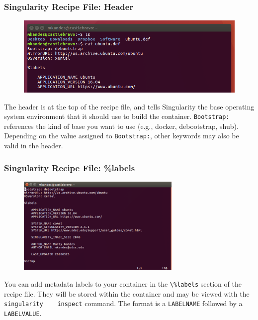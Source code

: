 \documentclass{beamer}
\begin{document}
\begin{frame}
   \frametitle{Singularity Recipe File: Header}
   \begin{figure}[htbp]
      \includegraphics[width=1.0\textwidth]{images/singularity-definition-file-header.png}
   \end{figure}
   The header is at the top of the recipe file, and tells Singularity
   the base operating system environment that it should use to build the
   container. \lstinline{Bootstrap:} references the kind of base you
   want to use (e.g., docker, debootstrap, shub). Depending on the value
   assigned to \lstinline{Bootstrap:}, other keywords may also be valid
   in the header.
\end{frame}

\begin{frame}
   \frametitle{Singularity Recipe File: \%labels}
   \begin{figure}[htbp]
      \includegraphics[width=0.7\textwidth]{images/singularity-definition-file-labels.png}
   \end{figure}
   You can add metadata labels to your container in the
   \lstinline{\%labels} section of the recipe file. They will be stored
   within the container and may be viewed with the \lstinline{singularity
   inspect} command. The format is a \lstinline{LABELNAME} followed by a
   \lstinline{LABELVALUE}.
\end{frame}
\end{document}
